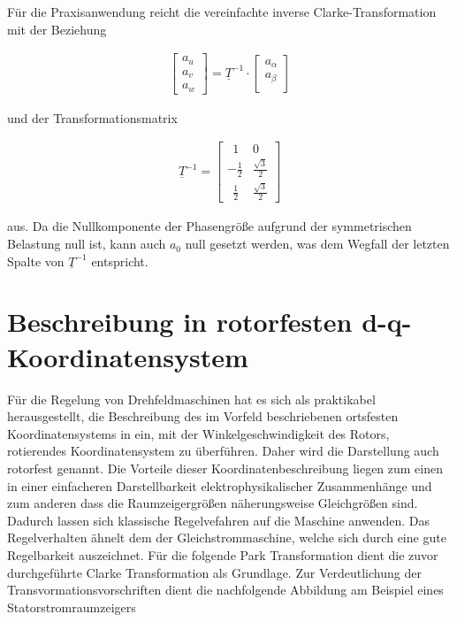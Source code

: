 Für die Praxisanwendung reicht die vereinfachte inverse Clarke-Transformation mit der Beziehung

\begin{align}
	\begin{bmatrix}
		a_{u} \\
		a_{v} \\
		a_{w}
	\end{bmatrix}
	=\underline{T}^{-1}\cdot 
	\begin{bmatrix}
		a_{\alpha} \\
		a_{\beta} \\
	\end{bmatrix}
	\label{inverseclarkevektornulleinfach}
\end{align}
 
 und der Transformationsmatrix 
 
 \begin{align}
 	\underline{T}^{-1} =
 	\begin{bmatrix}
 		~~1 & 0   \\
 		-\frac{1}{2} & \frac{\sqrt{3}}{2}  \\
 		~~\frac{1}{2} & \frac{\sqrt{3}}{2} 
 	\end{bmatrix}
 	\label{inverseclarkematrixnulleinfach}
 \end{align}
 
 aus. 
 Da die Nullkomponente der Phasengröße aufgrund der symmetrischen Belastung null ist, kann auch $a_{0}$ null gesetzt werden, was dem Wegfall der letzten Spalte von ${\underline{T}^{-1}}$ entspricht.

\section{Beschreibung in rotorfesten d-q-Koordinatensystem}\label{sec:park}

Für die Regelung von Drehfeldmaschinen hat es sich als praktikabel herausgestellt, die Beschreibung des im Vorfeld beschriebenen ortsfesten Koordinatensystems in ein, mit der Winkelgeschwindigkeit des Rotors, rotierendes Koordinatensystem zu überführen. 
Daher wird die Darstellung auch rotorfest genannt. 
Die Vorteile dieser Koordinatenbeschreibung liegen zum einen in einer einfacheren Darstellbarkeit elektrophysikalischer Zusammenhänge und zum anderen dass die Raumzeigergrößen näherungsweise Gleichgrößen sind.
Dadurch lassen sich klassische Regelvefahren auf die Maschine anwenden.
Das Regelverhalten ähnelt dem der Gleichstrommaschine, welche sich durch eine gute Regelbarkeit auszeichnet. 
Für die folgende Park Transformation dient die zuvor durchgeführte Clarke Transformation als Grundlage. 
Zur Verdeutlichung der Transvormationsvorschriften dient die nachfolgende Abbildung am Beispiel eines Statorstromraumzeigers

